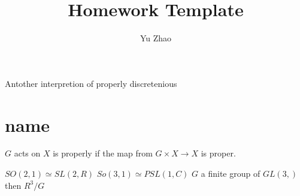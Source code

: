 \documentclass[12pt]{article}
\begin{document}




\title{Homework Template}%
\author{Yu Zhao} %

\maketitle
Antother interpretion of properly discretenious

\section{name}
\label{sec:label}

$G$ acts on $X$ is properly if the map from $G\times X\to X$ is proper.

$SO(2,1)\simeq SL(2,R)$
$So(3,1)\simeq PSL(1,C)$
$G$ a finite group of $GL(3, )$then $R^3/G$
\end{document}
